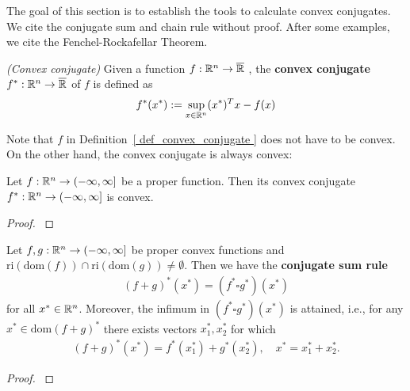 The goal of this section is to establish the tools to calculate convex conjugates. 
We cite the conjugate sum and chain rule without proof.
After some examples, we cite the Fenchel-Rockafellar Theorem.
\begin{definition}
  \label{ def_convex_conjugate }
  \emph{(Convex conjugate)}
  Given a function
  $
    f:
    \mathbb{R}^n \to \overline{\mathbb{R}}
  $
  ,
  the 
  \textbf{convex conjugate}
  $
    f^*:
    \mathbb{R}^n \to \overline{\mathbb{R}}
  $
  of $f$ is defined as
  \begin{gather}
    f^*(x^*)
    :=
    \sup_{ x \in \mathbb{R}^n }
    (x^*)^T x - f(x)
  \end{gather}
\end{definition}

Note that $f$ in Definition~\ref{ def_convex_conjugate }
does not have to be convex. On the other hand, the convex conjugate is always convex:

\begin{proposition}
  Let  
  $
    f:
    \mathbb{R}^n \to ( - \infty, \infty ]
  $
  be a proper function. 
  Then its convex conjugate
  $
    f^*:
    \mathbb{R}^n \to ( - \infty, \infty ]
  $
  is convex.
\end{proposition}
\begin{proof}
  \cite[Proposition~4.2]{Mordukhovich2022}
\end{proof}



\begin{theorem}
  Let
  $
    f,g:
    \mathbb{R}^n \to (-\infty, \infty]
  $
  be proper convex functions 
  and
  $
  \text{ri}\left( \text{dom}(f) \right)
  \cap
  \text{ri}\left( \text{dom}(g) \right)
  \neq 
  \emptyset
  .
  $
  Then we have the 
  \textbf{
  conjugate sum rule
  }
  \begin{gather}
    ( f + g )^*(x^*)
    =
    ( f^* \square g^*)(x^*)
  \end{gather}
  for all $x^* \in \mathbb{R}^n$.
  Moreover, the infimum in 
  $
    ( f^* \square g^*)(x^*)
  $
  is attained, i.e., for any
  $
    x^* \in \text{dom}(f+g)^*
  $
  there exists vectors $x_1^*, x_2^*$
  for which
  \begin{gather}
    (f+g)^*(x^*)
    =
    f^*(x_1^*)
    +
    g^*(x_2^*),
    \quad
    x^* = x_1^* + x_2^*.
  \end{gather}
\end{theorem}
\begin{proof}
  \cite[Theorem~4.27(c)]{Mordukhovich2022}
\end{proof}




